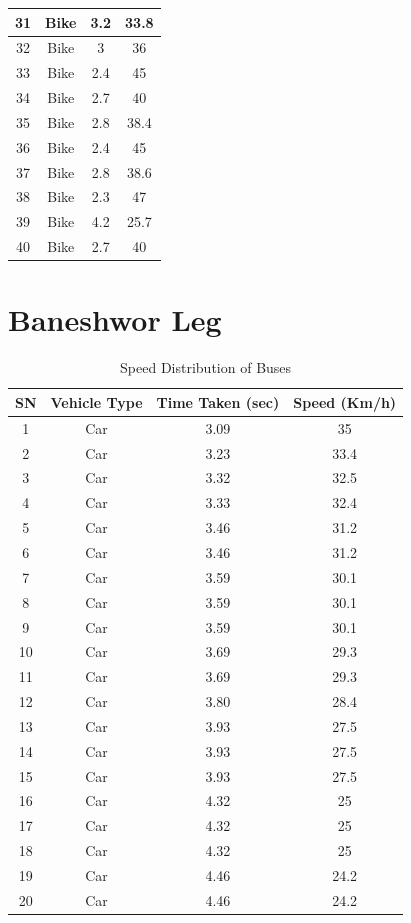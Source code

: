 \begin{table}[h!]
\begin{tabular}{|c|c|c|c|}
        31	&Bike	&3.2	&33.8 \\ \hline
        32	&Bike	&3	&36 \\ \hline
        33	&Bike	&2.4	&45 \\ \hline
        34	&Bike	&2.7	&40 \\ \hline
        35	&Bike	&2.8	&38.4 \\ \hline
        36	&Bike	&2.4	&45 \\ \hline
        37	&Bike	&2.8	&38.6 \\ \hline
        38	&Bike	&2.3	&47 \\ \hline
        39	&Bike	&4.2	&25.7 \\ \hline
        40	&Bike	&2.7	&40 \\ \hline

    \end{tabular}
\end{table}

\clearpage
\section{Baneshwor Leg}

\begin{table}[h!]
    \centering
    \caption{Speed Distribution of Buses}
    \begin{tabular}{|c|c|c|c|}
        \hline
        \textbf{SN}	& \textbf{Vehicle Type}	& \textbf{Time Taken (sec)}	& \textbf{Speed (Km/h)} \\ \hline
        1&	Car&	3.09&	35 \\ \hline
        2&	Car&	3.23&	33.4 \\ \hline
        3&	Car&	3.32&	32.5 \\ \hline
        4&	Car&	3.33&	32.4 \\ \hline
        5&	Car&	3.46&	31.2 \\ \hline
        6&	Car&	3.46&	31.2 \\ \hline 
        7&	Car&	3.59&	30.1 \\ \hline
        8&	Car&	3.59&	30.1 \\ \hline
        9&	Car&	3.59&	30.1 \\ \hline
        10&	Car&	3.69&	29.3 \\ \hline
        11&	Car&	3.69&	29.3 \\ \hline
        12&	Car&	3.80&	28.4 \\ \hline
        13&	Car&	3.93&	27.5 \\ \hline
        14&	Car&	3.93&	27.5 \\ \hline
        15&	Car&	3.93&	27.5 \\ \hline
        16&	Car&	4.32&	25 \\ \hline
        17&	Car&	4.32&	25 \\ \hline
        18&	Car&	4.32&	25 \\ \hline
        19&	Car&	4.46&	24.2 \\ \hline
        20&	Car&	4.46&	24.2 \\ \hline

    \end{tabular}
\end{table}


